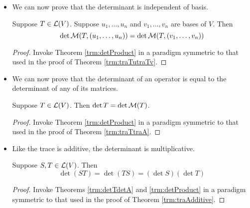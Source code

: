 \documentclass[../main.tex]{subfiles}
\begin{document}
\begin{itemize}
    \begin{theorem}\label{trm:detProduct}
        Suppose $A,B$ are square matrices of the same size. Then
        \begin{equation*}
            \det(AB) = \det(BA) = (\det A)(\det B)
        \end{equation*}
        \begin{proof}
            Given, but complicated. See LinAlgGIEPNotes on Browne.
        \end{proof}
    \end{theorem}
    \item We can now prove that the determinant is independent of basis.
    \begin{theorem}
        Suppose $T\in\mathcal{L}(V)$. Suppose $u_1,\dots,u_n$ and $v_1,\dots,v_n$ are bases of $V$. Then
        \begin{equation*}
            \det\mathcal{M}(T,(u_1,\dots,u_n)) = \det\mathcal{M}(T,(v_1,\dots,v_n))
        \end{equation*}
        \begin{proof}
            Invoke Theorem \ref{trm:detProduct} in a paradigm symmetric to that used in the proof of Theorem \ref{trm:traTutraTv}.
        \end{proof}
    \end{theorem}
    \item We can now prove that the determinant of an operator is equal to the determinant of any of its matrices.
    \begin{theorem}\label{trm:detTdetA}
        Suppose $T\in\mathcal{L}(V)$. Then $\det T=\det\mathcal{M}(T)$.
        \begin{proof}
            Invoke Theorem \ref{trm:detProduct} in a paradigm symmetric to that used in the proof of Theorem \ref{trm:traTtraA}.
        \end{proof}
    \end{theorem}
    \item Like the trace is additive, the determinant is multiplicative.
    \begin{theorem}
        Suppose $S,T\in\mathcal{L}(V)$. Then
        \begin{equation*}
            \det(ST) = \det(TS) = (\det S)(\det T)
        \end{equation*}
        \begin{proof}
            Invoke Theorems \ref{trm:detTdetA} and \ref{trm:detProduct} in a paradigm symmetric to that used in the proof of Theorem \ref{trm:traAdditive}.
        \end{proof}

\end{theorem}
\end{itemize}
\end{document}

